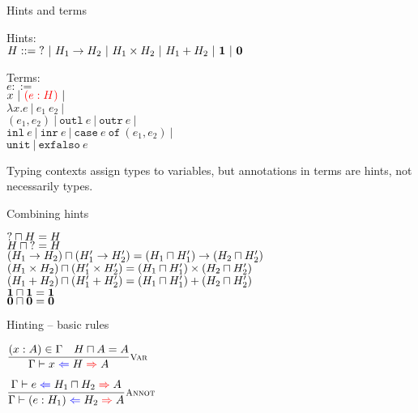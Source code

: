 \documentclass{beamer}
\newcommand{\pipe}{\ |\ }
\newcommand{\Fun}[2]{#1 \to #2}
\newcommand{\Prod}[2]{#1 \times #2}
\newcommand{\Sum}[2]{#1 + #2}
\newcommand{\Unit}{\textbf{1}}
\newcommand{\Empty}{\textbf{0}}
\newcommand{\annot}[2]{(#1 : #2)}
\newcommand{\fun}[2]{\lambda #1. #2}
\newcommand{\app}[2]{#1\ #2}
\newcommand{\pair}[2]{(#1, #2)}
\newcommand{\outl}[1][]{\texttt{outl}\ #1}
\newcommand{\outr}[1][]{\texttt{outr}\ #1}
\newcommand{\inl}[1][]{\texttt{inl}\ #1}
\newcommand{\inr}[1][]{\texttt{inr}\ #1}
\newcommand{\case}[3]{\texttt{case}\ #1\ \texttt{of}\ (#2, #3)}
\newcommand{\unit}{\texttt{unit}}
\newcommand{\exfalso}[1][]{\texttt{exfalso}\ #1}
\newcommand{\infrule}[3][]{\displaystyle \frac{#2}{#3} \textsc{\footnotesize{#1}}}
\newcommand{\sidecond}[1]{#1}
\begin{document}
\begin{frame}{Hints and terms}

Hints: \\
$H ::= \Hint \pipe \Fun{H_1}{H_2} \pipe \Prod{H_1}{H_2} \pipe \Sum{H_1}{H_2} \pipe \Unit \pipe \Empty$

\vspace{2em}

Terms: \\
$e ::=$ \\
\qquad $x \pipe \termdiff{\annot{e}{H}} \pipe $ \\
\qquad $\fun{x}{e} \pipe \app{e_1}{e_2} \pipe$ \\
\qquad $\pair{e_1}{e_2} \pipe \outl[e] \pipe \outr[e] \pipe$ \\
\qquad $\inl[e] \pipe \inr[e] \pipe \case{e}{e_1}{e_2} \pipe$ \\
\qquad $\unit \pipe \exfalso{e}$

\vspace{2em}

Typing contexts assign types to variables, but annotations in terms are hints, not necessarily types.

\end{frame}

\begin{frame}{Combining hints}

\begin{center}
  $\mathbf{?} \sqcap H = H$ \\
  $H \sqcap \mathbf{?} = H$ \\
  $\combinehints{(\Fun{H_1}{H_2})}{(\Fun{H'_1}{H'_2})} = \Fun{(\combinehints{H_1}{H'_1})}{(\combinehints{H_2}{H'_2})}$ \\
  $\combinehints{(\Prod{H_1}{H_2})}{(\Prod{H'_1}{H'_2})} = \Prod{(\combinehints{H_1}{H'_1})}{(\combinehints{H_2}{H'_2})}$ \\
  $\combinehints{(\Sum{H_1}{H_2})}{(\Sum{H'_1}{H'_2})} = \Sum{(\combinehints{H_1}{H'_1})}{(\combinehints{H_2}{H'_2})}$ \\
  $\combinehints{\Unit}{\Unit} = \Unit$ \\
  $\combinehints{\Empty}{\Empty} = \Empty$
\end{center}

\end{frame}

\begin{frame}{Hinting -- basic rules}

\begin{center}
  $\infrule[Var]{\sidecond{(x : A) \in \Gamma} \quad \sidecond{\combinehints{H}{A} = A}}{\hinting{x}{H}{A}}$

  \vspace{2em}

  $\infrule[Annot]{\hinting{e}{\combinehints{H_1}{H_2}}{A}}{\hinting{\annot{e}{H_1}}{H_2}{A}}$
\end{center}

\end{frame}
\end{document}
